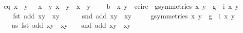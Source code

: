\begin{isabellebody}
\ \ \ eq{\isacharcolon}\ {\isachardoublequoteopen}x{\isacharprime}\ {\isacharasterisk}\ y{\isacharprime}\ {\isasymnoteq}\ {\isacharminus}\ x\ {\isacharasterisk}\ y{\isachardoublequoteclose}\ {\isachardoublequoteopen}x{\isacharprime}\ {\isacharasterisk}\ y{\isacharprime}\ {\isasymnoteq}\ x\ {\isacharasterisk}\ y{\isachardoublequoteclose}\ \isanewline
\ \ \ b{\isacharcolon}\ {\isachardoublequoteopen}{\isasymnot}\ {\isacharparenleft}{\isacharparenleft}x{\isacharcomma}\ y{\isacharparenright}\ {\isasymin}\ e{\isacharunderscore}circ\ {\isasymand}\ {\isacharparenleft}{\isasymexists}g{\isasymin}symmetries{\isachardot}\ {\isacharparenleft}x{\isacharprime}{\isacharcomma}\ y{\isacharprime}{\isacharparenright}\ {\isacharequal}\ {\isacharparenleft}g\ {\isasymcirc}\ i{\isacharparenright}\ {\isacharparenleft}x{\isacharcomma}\ y{\isacharparenright}{\isacharparenright}{\isacharparenright}{\isachardoublequoteclose}\isanewline
\ \ \ {\isachardoublequoteopen}\isanewline
\ \ fst\ {\isacharparenleft}add\ {\isacharparenleft}x{\isacharcomma}y{\isacharparenright}\ {\isacharparenleft}{\isasymtau}\ {\isacharparenleft}x{\isacharprime}{\isacharcomma}y{\isacharprime}{\isacharparenright}{\isacharparenright}{\isacharparenright}\ {\isacharequal}\ {}\ {\isasymor}\ \isanewline
\ \ snd\ {\isacharparenleft}add\ {\isacharparenleft}x{\isacharcomma}y{\isacharparenright}\ {\isacharparenleft}{\isasymtau}\ {\isacharparenleft}x{\isacharprime}{\isacharcomma}y{\isacharprime}{\isacharparenright}{\isacharparenright}{\isacharparenright}\ {\isacharequal}\ {}\ {\isasymLongrightarrow}\isanewline
\ \ {\isacharparenleft}{\isasymexists}g{\isasymin}symmetries{\isachardot}\ {\isacharparenleft}x{\isacharprime}{\isacharcomma}\ y{\isacharprime}{\isacharparenright}\ {\isacharequal}\ {\isacharparenleft}g\ {\isasymcirc}\ i{\isacharparenright}\ {\isacharparenleft}x{\isacharcomma}\ y{\isacharparenright}{\isacharparenright}{\isachardoublequoteclose}\isanewline
%
\isadelimproof
%
\endisadelimproof
%
\isatagproof
{}\isamarkupfalse%
\ {\isacharminus}\isanewline
\ \ \isamarkupfalse%
\ as{\isacharcolon}\ {\isachardoublequoteopen}fst\ {\isacharparenleft}add\ {\isacharparenleft}x{\isacharcomma}y{\isacharparenright}\ {\isacharparenleft}{\isasymtau}\ {\isacharparenleft}x{\isacharprime}{\isacharcomma}y{\isacharprime}{\isacharparenright}{\isacharparenright}{\isacharparenright}\ {\isacharequal}\ {}\ {\isasymor}\ snd\ {\isacharparenleft}add\ {\isacharparenleft}x{\isacharcomma}y{\isacharparenright}\ {\isacharparenleft}{\isasymtau}\ {\isacharparenleft}x{\isacharprime}{\isacharcomma}y{\isacharprime}{\isacharparenright}{\isacharparenright}{\isacharparenright}\ {\isacharequal}\ {}{\isachardoublequoteclose}\isanewline

\end{isabellebody}
